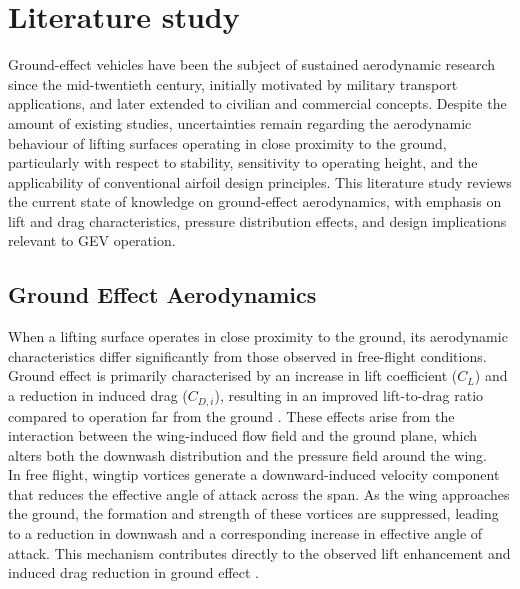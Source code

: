 \section{Literature study}

Ground-effect vehicles have been the subject of sustained aerodynamic research since the mid-twentieth century, initially motivated by military transport applications, and later extended to civilian and commercial concepts. Despite the amount of existing studies, uncertainties remain regarding the aerodynamic behaviour of lifting surfaces operating in close proximity to the ground, particularly with respect to stability, sensitivity to operating height, and the applicability of conventional airfoil design principles. This literature study reviews the current state of knowledge on ground-effect aerodynamics, with emphasis on lift and drag characteristics, pressure distribution effects, and design implications relevant to GEV operation.\\

\subsection{Ground Effect Aerodynamics}

When a lifting surface operates in close proximity to the ground, its aerodynamic characteristics differ significantly from those observed in free-flight conditions. Ground effect is primarily characterised by an increase in lift coefficient ($C_L$) and a reduction in induced drag ($C_{D,i}$), resulting in an improved lift-to-drag ratio compared to operation far from the ground \cite{WIGE-vehicles}. These effects arise from the interaction between the wing-induced flow field and the ground plane, which alters both the downwash distribution and the pressure field around the wing.\\

\noindent In free flight, wingtip vortices generate a downward-induced velocity component that reduces the effective angle of attack across the span. As the wing approaches the ground, the formation and strength of these vortices are suppressed, leading to a reduction in downwash and a corresponding increase in effective angle of attack. This mechanism contributes directly to the observed lift enhancement and induced drag reduction in ground effect \cite{IJET_GEV_investigation}\cite{ASME_CFD_simulation}.\\


